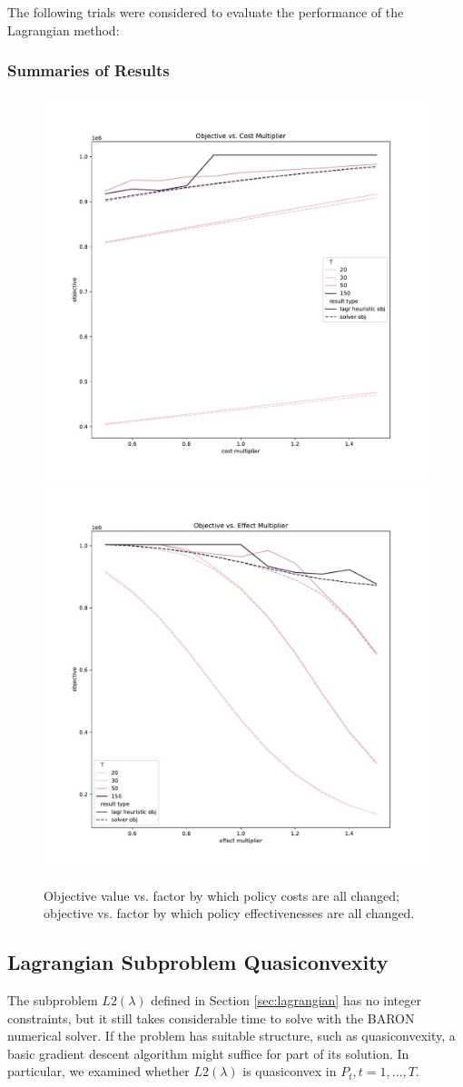 \documentclass{article}
\begin{document}
The following trials were considered to evaluate the performance of the Lagrangian method:




\subsubsection{Summaries of Results}
\begin{figure}[H]
    \center
    \includegraphics[width=0.45\linewidth]{figures/objective_vs_cost_multiplier.pdf}
    \includegraphics[width=0.45\linewidth]{figures/objective_vs_effect_multiplier.pdf}
    \caption{Objective value vs. factor by which policy costs are all changed; objective vs. factor by which policy effectivenesses are all changed.}
\end{figure}



\subsection{Lagrangian Subproblem Quasiconvexity}

The subproblem $L2(\lambda)$ defined in Section \ref{sec:lagrangian} has no integer constraints, but it still takes considerable time to solve with the BARON numerical solver. If the problem has suitable structure, such as quasiconvexity, a basic gradient descent algorithm might suffice for part of its solution. In particular, we examined whether $L2(\lambda)$ is quasiconvex in $P_t,t=1,\ldots,T$.
\end{document}
